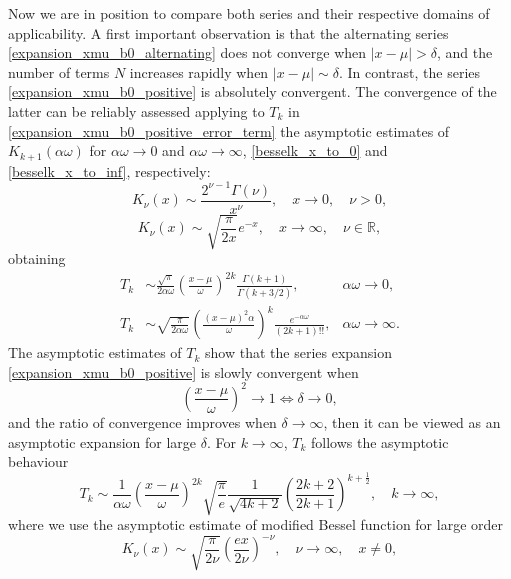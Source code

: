 \documentclass[10pt,a4paper,oneside]{article}
\numberwithin{equation}{section}
\begin{document}
Now we are in position to compare both series and their respective domains of applicability. A first important observation is that the alternating series \eqref{expansion_xmu_b0_alternating} does not converge when $|x - \mu| > \delta$, and the number of terms $N$ increases rapidly when $|x - \mu| \sim \delta$. In contrast, the series \eqref{expansion_xmu_b0_positive} is absolutely convergent. The convergence of the latter can be reliably assessed applying to $T_k$ in \eqref{expansion_xmu_b0_positive_error_term} the asymptotic estimates of $K_{k+1}(\alpha\omega)$ for $\alpha \omega \to 0$ and $\alpha \omega \to \infty$, \eqref{besselk_x_to_0} and \eqref{besselk_x_to_inf}, respectively:
\begin{equation}\label{besselk_x_to_0}
K_{\nu}(x) \sim \frac{2^{\nu - 1} \Gamma(\nu)}{x^{\nu}}, \quad x \to 0, \quad \nu > 0,
\end{equation}
\begin{equation}\label{besselk_x_to_inf}
K_{\nu}(x) \sim \sqrt{\frac{\pi}{2x}} e^{-x}, \quad x \to \infty, \quad \nu \in \mathbb{R},
\end{equation}
obtaining
\begin{align*}
T_k &\sim \frac{\sqrt{\pi}}{2\alpha\omega} \left(\frac{x-\mu}{\omega}\right)^{2k}\frac{\Gamma(k + 1)}{\Gamma(k + 3/2)}, & \alpha\omega \to 0,\\
T_k &\sim \sqrt{\frac{\pi}{2\alpha \omega}} \left(\frac{(x-\mu)^2\alpha}{\omega}\right)^k \frac{e^{-\alpha \omega}}{(2k + 1)!!}, &\alpha\omega \to \infty.
\end{align*}
The asymptotic estimates of $T_k$ show that the series expansion \eqref{expansion_xmu_b0_positive} is slowly convergent when
\begin{equation*}
\left(\frac{x-\mu}{\omega}\right)^2 \to 1 \Longleftrightarrow \delta \to 0,
\end{equation*}
and the ratio of convergence improves when $\delta \to \infty$, then it can be viewed as an asymptotic expansion for large $\delta$. For $k \to \infty$, $T_k$ follows the asymptotic behaviour
\begin{equation*}
T_k \sim \frac{1}{\alpha\omega}\left(\frac{x-\mu}{\omega}\right)^{2k}\sqrt{\frac{\pi}{e}}\frac{1}{\sqrt{4k + 2}}\left(\frac{2k + 2}{2k + 1}\right)^{k + \frac{1}{2}}, \quad k \to \infty,
\end{equation*}
where we use the asymptotic estimate of modified Bessel function for large order
\begin{equation}\label{besselk_order_to_inf}
K_{\nu}(x) \sim \sqrt{\frac{\pi}{2\nu}}\left(\frac{ex}{2\nu}\right)^{-\nu}, \quad \nu \to \infty, \quad x \neq 0,
\end{equation}
\end{document}
